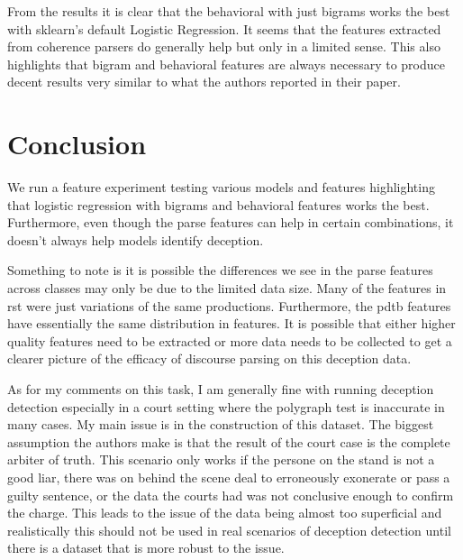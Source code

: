 \documentclass[12pt]{article}
\begin{document}
From the results it is clear that the behavioral with just bigrams works the
best with sklearn's default Logistic Regression. It seems that the features
extracted from coherence parsers do generally help but only in a limited sense.
This also highlights that bigram and behavioral features are always necessary to
produce decent results very similar to what the authors reported in their paper.

\section{Conclusion}
We run a feature experiment testing various models and features highlighting
that logistic regression with bigrams and behavioral features works the best.
Furthermore, even though the parse features can help in certain combinations, it
doesn't always help models identify deception.

Something to note is it is possible the differences we see in the parse features
across classes may only be due to the limited data size. Many of the features in
rst were just variations of the same productions. Furthermore, the pdtb features
have essentially the same distribution in features. It is possible that either
higher quality features need to be extracted or more data needs to be collected
to get a clearer picture of the efficacy of discourse parsing on this deception
data. 

As for my comments on this task, I am generally fine with running deception
detection especially in a court setting where the polygraph test is inaccurate
in many cases. My main issue is in the construction of this dataset. The biggest
assumption the authors make is that the result of the court case is the complete
arbiter of truth. This scenario only works if the persone on the stand is not a
good liar, there was on behind the scene deal to erroneously exonerate or pass a
guilty sentence, or the data the courts had was not conclusive enough to confirm
the charge. This leads to the issue of the data being almost too superficial and
realistically this should not be used in real scenarios of deception detection
until there is a dataset that is more robust to the issue.



  

\printbibliography
\end{document}
